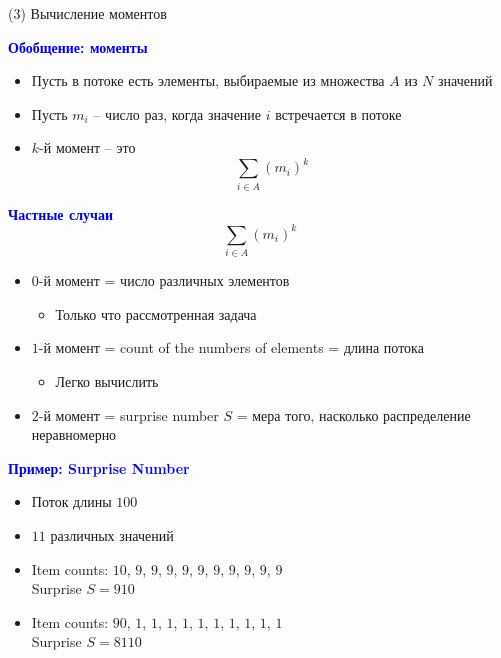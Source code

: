 \documentclass[landscape]{slides}
\begin{document}
\begin{normalsize}
\begin{slide}
(3) Вычисление моментов
\end{slide}


\begin{slide}
\textbf{\textcolor{blue}{Обобщение: моменты}}

\begin{itemize}
\item Пусть в потоке есть элементы, выбираемые из множества $A$ из $N$ значений
\item Пусть $m_i$ -- число раз, когда значение $i$ встречается в потоке
\item $k$-й момент -- это
$$ \sum_{i\in A} (m_i)^k $$
\end{itemize}
\end{slide}


\begin{slide}
\textbf{\textcolor{blue}{Частные случаи}}
$$ \sum_{i\in A} (m_i)^k $$

\begin{itemize}
\item $0$-й момент = число различных элементов
  \begin{itemize}
  \item Только что рассмотренная задача
  \end{itemize}
\item $1$-й момент = count of the numbers of elements = длина потока
  \begin{itemize}
  \item Легко вычислить
  \end{itemize}
\item $2$-й момент = surprise number $S$ =
мера того, насколько распределение неравномерно
\end{itemize}
\end{slide}


\begin{slide}
\textbf{\textcolor{blue}{Пример: Surprise Number}}

\begin{itemize}
\item Поток длины $100$
\item $11$ различных значений
\item Item counts: $10$, $9$, $9$, $9$, $9$, $9$, $9$, $9$, $9$, $9$, $9$ \\
      Surprise $S=910$
\item Item counts: $90$, $1$, $1$, $1$, $1$, $1$, $1$, $1$, $1$, $1$, $1$ \\
      Surprise $S=8110$
\end{itemize}
\end{slide}



\end{normalsize}
\end{document}
